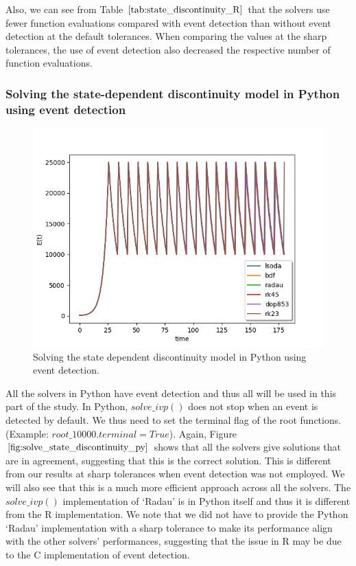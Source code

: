 Also, we can see from Table $\ref{tab:state_discontinuity_R}$ that the solvers use fewer function evaluations compared with event detection than without event detection at the default tolerances. When comparing the values at the sharp tolerances, the use of event detection also decreased the respective number of function evaluations.

\subsubsection{Solving the state-dependent discontinuity model in Python using event detection}
\begin{figure}[H]
\centering
\includegraphics[width=0.7\linewidth]{./figures/solve_state_discontinuity_py}
\caption{Solving the state dependent discontinuity model in Python using event detection.}
\label{fig:solve_state_discontinuity_py}
\end{figure}
All the solvers in Python have event detection and thus all will be used in this part of the study. In Python, $solve\_ivp()$ does not stop when an event is detected by default. We thus need to set the terminal flag of the root functions.
(Example: $root\_10000.terminal = True$).
Again, Figure $\ref{fig:solve_state_discontinuity_py}$ shows that all the solvers give solutions that are in agreement, suggesting that this is the correct solution. This is different from our results at sharp tolerances when event detection was not employed. We will also see that this is a much more efficient approach across all the solvers. The $solve\_ivp()$ implementation of `Radau' is in Python itself and thus it is different from the R implementation. We note that we did not have to provide the Python `Radau' implementation with a sharp tolerance to make its performance align with the other solvers' performances, suggesting that the issue in R may be due to the C implementation of event detection.

